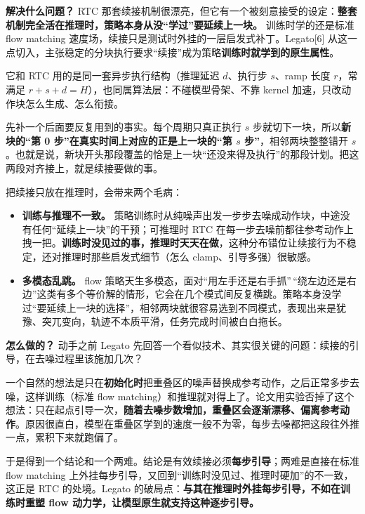 \documentclass[
  chinese,
]{ctexart}
\providecommand{\tightlist}{%
  \setlength{\itemsep}{0pt}\setlength{\parskip}{0pt}}
\begin{document}
\textbf{解决什么问题？} RTC
那套续接机制很漂亮，但它有一个被刻意接受的设定：\textbf{整套机制完全活在推理时，策略本身从没``学过''要延续上一块。}
训练时学的还是标准 flow matching
速度场，续接只是测试时外挂的一层启发式补丁。Legato{[}6{]}
从这一点切入，主张稳定的分块执行要求``续接''成为策略\textbf{训练时就学到的原生属性}。

它和 RTC 用的是同一套异步执行结构（推理延迟 \(d\)、执行步 \(s\)、ramp
长度 \(r\)，常满足 \(r + s + d = H\)），也同属算法层：不碰模型骨架、不靠
kernel 加速，只改动作块怎么生成、怎么衔接。

先补一个后面要反复用到的事实。每个周期只真正执行 \(s\)
步就切下一块，所以\textbf{新块的``第 0
步''在真实时间上对应的正是上一块的``第 \(s\) 步''}，相邻两块整整错开
\(s\)。也就是说，新块开头那段覆盖的恰是上一块``还没来得及执行''的那段计划。把这两段对齐接上，就是续接要做的事。

把续接只放在推理时，会带来两个毛病：

\begin{itemize}
\tightlist
\item
  \textbf{训练与推理不一致。}
  策略训练时从纯噪声出发一步步去噪成动作块，中途没有任何``延续上一块''的干预；可推理时
  RTC
  在每一步去噪前都往参考动作上拽一把。\textbf{训练时没见过的事，推理时天天在做}，这种分布错位让续接行为不稳定，还对推理时那些启发式细节（怎么
  clamp、引导多强）很敏感。
\item
  \textbf{多模态乱跳。} flow
  策略天生多模态，面对``用左手还是右手抓''\,``绕左边还是右边''这类有多个等价解的情形，它会在几个模式间反复横跳。策略本身没学过``要延续上一块的选择''，相邻两块就很容易选到不同模式，表现出来是犹豫、突兀变向，轨迹不本质平滑，任务完成时间被白白拖长。
\end{itemize}

\textbf{怎么做的？} 动手之前 Legato
先回答一个看似技术、其实很关键的问题：续接的引导，在去噪过程里该施加几次？

一个自然的想法是只在\textbf{初始化时}把重叠区的噪声替换成参考动作，之后正常多步去噪，这样训练（标准
flow
matching）和推理就对得上了。论文用实验否掉了这个想法：只在起点引导一次，\textbf{随着去噪步数增加，重叠区会逐渐漂移、偏离参考动作}。原因很直白，模型在重叠区学到的速度一般不为零，每步去噪都把这段往外推一点，累积下来就跑偏了。

于是得到一个结论和一个两难。结论是有效续接必须\textbf{每步引导}；两难是直接在标准
flow matching
上外挂每步引导，又回到``训练时没见过、推理时硬加''的不一致，这正是 RTC
的处境。Legato
的破局点：\textbf{与其在推理时外挂每步引导，不如在训练时重塑 flow
动力学，让模型原生就支持这种逐步引导。}
\end{document}
